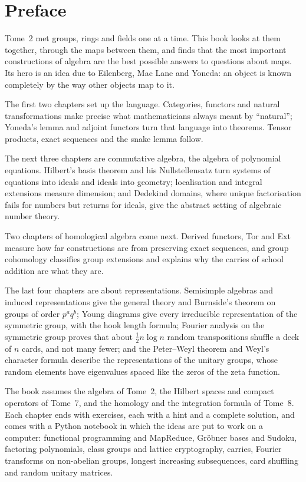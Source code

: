 \chapter*{Preface}
Tome~2 met groups, rings and fields one at a time. This book looks at them together, through the maps between them, and finds that
the most important constructions of algebra are the best possible answers to questions about maps. Its hero is an idea due to
Eilenberg, Mac Lane and Yoneda: an object is known completely by the way other objects map to it.

The first two chapters set up the language. Categories, functors and natural transformations make precise what mathematicians always
meant by ``natural''; Yoneda's lemma and adjoint functors turn that language into theorems. Tensor products, exact sequences and
the snake lemma follow.

The next three chapters are commutative algebra, the algebra of polynomial equations. Hilbert's basis theorem and his
Nullstellensatz turn systems of equations into ideals and ideals into geometry; localisation and integral extensions measure
dimension; and Dedekind domains, where unique factorisation fails for numbers but returns for ideals, give the abstract setting of
algebraic number theory.

Two chapters of homological algebra come next. Derived functors, Tor and Ext measure how far constructions are from preserving exact
sequences, and group cohomology classifies group extensions and explains why the carries of school addition are what they are.

The last four chapters are about representations. Semisimple algebras and induced representations give the general theory and
Burnside's theorem on groups of order $p^aq^b$; Young diagrams give every irreducible representation of the symmetric group, with the
hook length formula; Fourier analysis on the symmetric group proves that about $\frac12n\log n$ random transpositions shuffle a deck
of $n$ cards, and not many fewer; and the Peter--Weyl theorem and Weyl's character formula describe the representations of the
unitary groups, whose random elements have eigenvalues spaced like the zeros of the zeta function.

The book assumes the algebra of Tome~2, the Hilbert spaces and compact operators of Tome~7, and the homology and the integration
formula of Tome~8. Each chapter ends with exercises, each with a hint and a complete solution, and comes with a Python notebook in which
the ideas are put to work on a computer: functional programming and MapReduce, Gröbner bases and Sudoku, factoring polynomials,
class groups and lattice cryptography, carries, Fourier transforms on non-abelian groups, longest increasing subsequences, card
shuffling and random unitary matrices.
